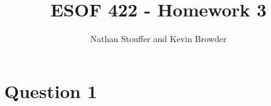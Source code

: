 \documentclass{article}
\begin{document}
	
\title{ESOF 422 - Homework 3}
\author{Nathan Stouffer and Kevin Browder}

\maketitle
\newpage

\section*{Question 1}
\end{document}
